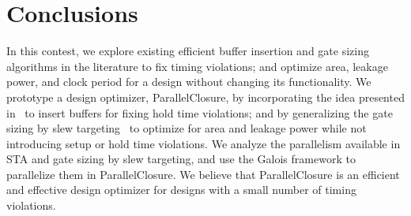 \section{Conclusions}
\label{sec:conclusions}

In this contest, we explore existing efficient buffer insertion and gate sizing algorithms in the literature to fix timing violations; and optimize area, leakage power, and clock period for a design without changing its functionality. We prototype a design optimizer, ParallelClosure, by incorporating the idea presented in~\cite{Shenoy:Minimum} to insert buffers for fixing hold time violations; and by generalizing the gate sizing by slew targeting~\cite{Held:Gate} to optimize for area and leakage power while not introducing setup or hold time violations. We analyze the parallelism available in STA and gate sizing by slew targeting, and use the Galois framework to parallelize them in ParallelClosure. We believe that ParallelClosure is an efficient and effective design optimizer for designs with a small number of timing violations.

